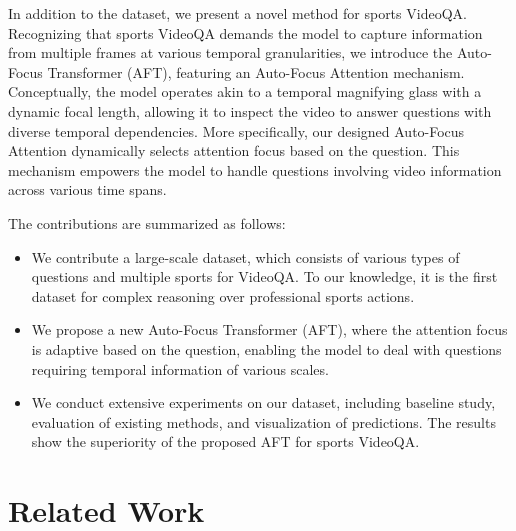 {In addition to the dataset, we present a novel method for sports VideoQA. Recognizing that sports VideoQA demands the model to capture information from multiple frames at various temporal granularities, we introduce the Auto-Focus Transformer (AFT), featuring an Auto-Focus Attention mechanism. Conceptually, the model operates akin to a temporal magnifying glass with a dynamic focal length, allowing it to inspect the video to answer questions with diverse temporal dependencies. More specifically, our designed Auto-Focus Attention dynamically selects attention focus based on the question. This mechanism empowers the model to handle questions involving video information across various time spans.




The contributions are summarized as follows:

\begin{itemize}

    \item We contribute a large-scale dataset, which consists of various types of questions and multiple sports for VideoQA.  %
To our knowledge, it is the first dataset for complex reasoning over professional sports actions. 

    \item We propose a new Auto-Focus Transformer (AFT), where the attention focus is adaptive based on the question,  enabling the model to deal with questions requiring temporal information of various scales.


    \item We conduct extensive experiments on our dataset, including baseline study, evaluation of existing methods, and visualization of predictions. The results show the superiority of the proposed AFT for sports VideoQA. %
\end{itemize}






\section{Related Work}


}
